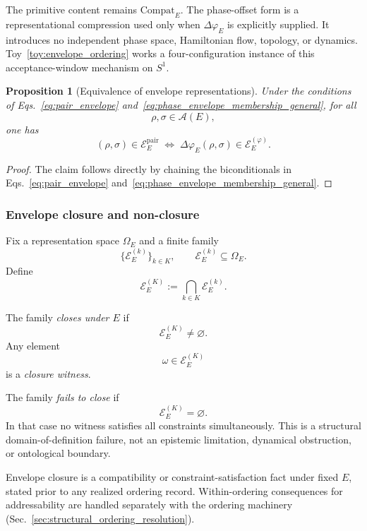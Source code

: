 \documentclass[aps,prx,onecolumn,11pt]{revtex4-2}
\theoremstyle{plain}
\newtheorem{proposition}{Proposition}
\theoremstyle{definition}
\theoremstyle{remark}
\begin{document}
The primitive content remains \(\mathrm{Compat}_E\). The phase-offset
form is a representational compression used only when
\(\Delta\varphi_E\) is explicitly supplied. It introduces no independent
phase space, Hamiltonian flow, topology, or dynamics.
Toy~\ref{toy:envelope_ordering} works a four-configuration
instance of this acceptance-window mechanism on \(S^1\).

\begin{proposition}[Equivalence of envelope representations]
\label{prop:envelope_rep_equiv}
Under the conditions of Eqs.~\eqref{eq:pair_envelope}
and~\eqref{eq:phase_envelope_membership_general}, for all
\[
\rho,\sigma\in\mathcal{A}(E),
\]
one has
\[
(\rho,\sigma)\in\mathcal{E}^{\mathrm{pair}}_E
\;\Longleftrightarrow\;
\Delta\varphi_E(\rho,\sigma)\in\mathcal{E}^{(\varphi)}_E.
\]
\end{proposition}

\begin{proof}
The claim follows directly by chaining the biconditionals in
Eqs.~\eqref{eq:pair_envelope}
and~\eqref{eq:phase_envelope_membership_general}.
\end{proof}

\subsubsection{Envelope closure and non-closure}
\label{subsubsec:envelope_nonclosure_structural}

Fix a representation space \(\Omega_E\) and a finite family
\[
\{\mathcal{E}^{(k)}_E\}_{k\in K},
\qquad
\mathcal{E}^{(k)}_E\subseteq\Omega_E.
\]
Define
\begin{equation}
\mathcal{E}^{(K)}_E
:=
\bigcap_{k\in K}
\mathcal{E}^{(k)}_E.
\label{eq:envelope_intersection}
\end{equation}

The family \emph{closes under \(E\)} if
\[
\mathcal{E}^{(K)}_E\neq\varnothing.
\]
Any element
\[
\omega\in\mathcal{E}^{(K)}_E
\]
is a \emph{closure witness}.

The family \emph{fails to close} if
\[
\mathcal{E}^{(K)}_E=\varnothing.
\]
In that case no witness satisfies all constraints simultaneously. This
is a structural domain-of-definition failure, not an epistemic
limitation, dynamical obstruction, or ontological boundary.

Envelope closure is a compatibility or constraint-satisfaction fact
under fixed \(E\), stated prior to any realized ordering record.
Within-ordering consequences for addressability are handled separately
with the ordering machinery
(Sec.~\ref{sec:structural_ordering_resolution}).
\end{document}
